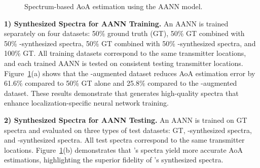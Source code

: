 \begin{figure}[t]
	\vspace{-0.2in}
\caption{Spectrum-based AoA estimation  using the AANN model.}
\label{fig_case_study}
\end{figure}






\textbf{1) Synthesized Spectra for AANN Training.}  
An AANN is trained separately on four datasets: 50\% ground truth (GT), 50\% GT combined with 50\% \nerft-synthesized spectra, 50\% GT combined with 50\% \ourSystem-synthesized spectra, and 100\% GT. 
All training datasets correspond to the same transmitter locations, and each trained AANN is tested on consistent testing transmitter locations.
Figure~\ref{fig_case_study}(a) shows that the \ourSystem-augmented dataset reduces AoA estimation error by 61.6\% compared to 50\% GT alone and 25.8\% compared to the \nerft-augmented dataset. 
These results demonstrate that \ourSystem generates high-quality spectra that enhance localization-specific neural network training.




\textbf{2) Synthesized Spectra for AANN Testing.}  
An AANN is trained on GT spectra and evaluated on three types of test datasets: GT, \nerft-synthesized spectra, and \ourSystem-synthesized spectra. 
All test spectra correspond to the same transmitter locations. 
Figure~\ref{fig_case_study}(b) demonstrates that \ourSystem's spectra yield more accurate AoA estimations, highlighting the superior fidelity of \ourSystem's synthesized spectra.



